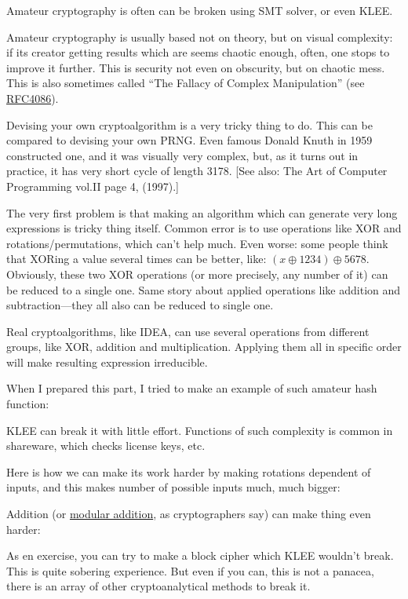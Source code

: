 Amateur cryptography is often can be broken using SMT solver, or even KLEE.

Amateur cryptography is usually based not on theory, but on visual complexity:
if its creator getting results which are seems chaotic enough, often, one stops to improve it further.
This is security not even on obscurity, but on chaotic mess.
This is also sometimes called ``The Fallacy of Complex Manipulation''
(see \href{https://tools.ietf.org/html/rfc4086}{RFC4086}).

Devising your own cryptoalgorithm is a very tricky thing to do.
This can be compared to devising your own \ac{PRNG}.
Even famous Donald Knuth in 1959 constructed one, and it was visually very complex,
but, as it turns out in practice, it has very short cycle of length 3178.
[See also: The Art of Computer Programming vol.II page 4, (1997).]

The very first problem is that making an algorithm which can generate very long expressions is tricky thing itself.
Common error is to use operations like XOR and rotations/permutations, which can't help much.
Even worse: some people think that XORing a value several times can be better, like: $(x \oplus 1234) \oplus 5678$.
Obviously, these two XOR operations (or more precisely, any number of it) can be reduced to a single one.
Same story about applied operations like addition and subtraction---they all also can be reduced to single one.

Real cryptoalgorithms, like IDEA, can use several operations from different groups, like XOR, addition and multiplication.
Applying them all in specific order will make resulting expression irreducible.

When I prepared this part, I tried to make an example of such amateur hash function:



KLEE can break it with little effort.
Functions of such complexity is common in shareware, which checks license keys, etc.

Here is how we can make its work harder by making rotations dependent of inputs,
and this makes number of possible inputs much, much bigger:



Addition (or \href{https://yurichev.com/blog/modulo/}{modular addition}, as cryptographers say) can make thing even harder:



As en exercise, you can try to make a block cipher which KLEE wouldn't break.
This is quite sobering experience.
But even if you can, this is not a panacea, there is an array of other cryptoanalytical methods to break it.

